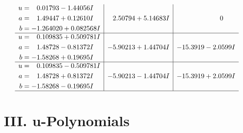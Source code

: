 \documentclass[1p]{elsarticle_modified}
\theoremstyle{definition}
\begin{document}
$$\begin{array}{c|c|c}
\begin{aligned}
u &= \phantom{-}0.01793 - 1.44056 I \\
a &= \phantom{-}1.49447 + 0.12610 I \\
b &= -1.264020 + 0.082568 I\end{aligned}
 & \phantom{-}2.50794 + 5.14683 I & \phantom{-0.000000 } 0 \\ \hline\begin{aligned}
u &= \phantom{-}0.109835 + 0.509781 I \\
a &= \phantom{-}1.48728 - 0.81372 I \\
b &= -1.58268 + 0.19695 I\end{aligned}
 & -5.90213 + 1.44704 I & -15.3919 - 2.0599 I \\ \hline\begin{aligned}
u &= \phantom{-}0.109835 - 0.509781 I \\
a &= \phantom{-}1.48728 + 0.81372 I \\
b &= -1.58268 - 0.19695 I\end{aligned}
 & -5.90213 - 1.44704 I & -15.3919 + 2.0599 I\\
 \hline 
 \end{array}$$\newpage
\newpage\renewcommand{\arraystretch}{1}
\centering \section*{ III. u-Polynomials}
\end{document}
